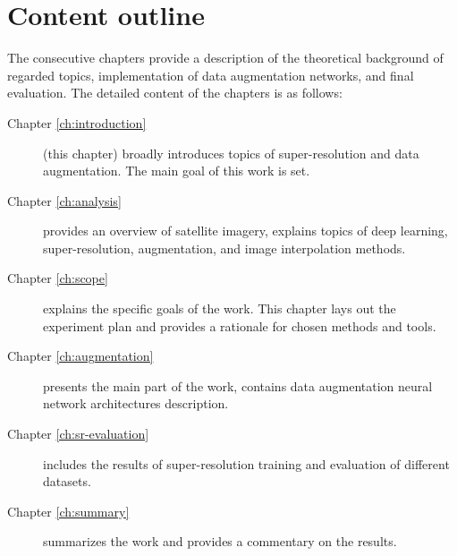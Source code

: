 \section{Content outline}
The consecutive chapters provide a description of the theoretical background of regarded topics, implementation of data augmentation networks, and final evaluation.
The detailed content of the chapters is as follows:
\begin{description}
	\item [Chapter \ref{ch:introduction}] (this chapter) broadly introduces topics of super-resolution and data augmentation. The main goal of this work is set.
	\item [Chapter \ref{ch:analysis}] provides an overview of satellite imagery, explains topics of deep learning, super-resolution, augmentation, and image interpolation methods.
	\item [Chapter \ref{ch:scope}] explains the specific goals of the work. This chapter lays out the experiment plan and provides a rationale for chosen methods and tools.
	\item [Chapter \ref{ch:augmentation}] presents the main part of the work, contains data augmentation neural network architectures description.
	\item [Chapter \ref{ch:sr-evaluation}] includes the results of super-resolution training and evaluation of different datasets.
	\item [Chapter \ref{ch:summary}] summarizes the work and provides a commentary on the results.
\end{description}
